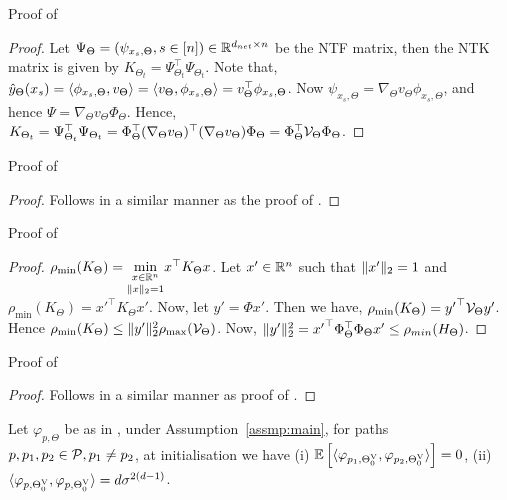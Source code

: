 \begin{appendix}
Proof of 
\begin{proof}
Let $\Psi_{\Theta}=(\psi_{x_s,\Theta},s\in[n])\in\R^{d_{net}\times n}$ be the NTF matrix, then the NTK matrix is given by $K_{\Theta_t}=\Psi^\top_{\Theta_t}\Psi_{\Theta_t}$. Note that, $\hat{y}_{\Theta}(x_s)=\ip{\phi_{x_s,\Theta},v_{\Theta}}=\ip{v_{\Theta},\phi_{x_s,\Theta}}=v^\top_{\Theta}\phi_{x_s,\Theta}$. Now $\psi_{x_{s},\Theta}=\nabla_{\Theta} v_{\Theta}\phi_{x_s,\Theta}$, and hence $\Psi=\nabla_{\Theta} v_{\Theta}\Phi_{\Theta}$. Hence, $K_{\Theta_t}=\Psi^\top_{\Theta_t}\Psi_{\Theta_t}=\Phi^\top_{\Theta}(\nabla_{\Theta} v_{\Theta})^\top (\nabla_{\Theta} v_{\Theta})\Phi_{\Theta}=\Phi^\top_{\Theta}\V_{\Theta}\Phi_{\Theta}$.
\end{proof}

Proof of 

\begin{proof}
Follows in a similar manner as the proof of .
\end{proof}

Proof of {}
\begin{proof}
$\rho_{\min}(K_{\Theta})=\underset{\norm{x}_2=1}{\underset{x\in \R^n}\min}x^\top K_{\Theta} x$. Let $x'\in\R^n$ such that $\norm{x'}_2=1$ and $\rho_{\min}(K_{\Theta})={x'}^\top K_{\Theta} x'$. Now, let $y'=\Phi x'$. Then we have, $\rho_{\min}(K_{\Theta})={y'}^\top \V_{\Theta}y'$. Hence $\rho_{\min}(K_{\Theta})\leq \norm{y'}^2_2 \rho_{\max}(\V_{\Theta})$. Now, $\norm{y'}^2_2={x'}^\top \Phi^\top_{\Theta}\Phi_{\Theta}x'\leq \rho_{min}(H_{\Theta})$.
\end{proof}


Proof of 

\begin{proof}
Follows in a similar manner as proof of .
\end{proof}


\begin{lemma}\label{lm:dot}
Let $\varphi_{p,\Theta}$ be as in , under Assumption~\ref{assmp:main}, for paths $p,p_1,p_2\in \P, p_1\neq p_2$, at initialisation we have (i) $\E{\ip{\varphi_{p_1,\Tv_0}, \varphi_{p_2,\Tv_0}}}= 0$, (ii) ${\ip{\varphi_{p,\Tv_0}, \varphi_{p,\Tv_0}}}= d\sigma^{2(d-1)}$.
\end{lemma}


\end{appendix}
